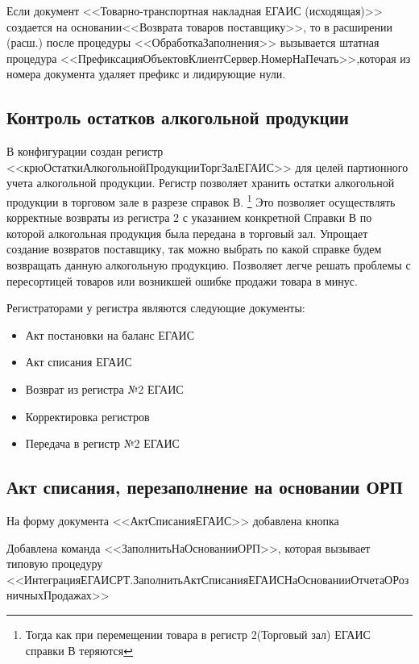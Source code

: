 Если документ <<Товарно-транспортная накладная ЕГАИС (исходящая)>> создается на основании<<Возврата товаров поставщику>>, то в расширении (расш.)
 после процедуры <<ОбработкаЗаполнения>> вызывается штатная процедура <<ПрефиксацияОбъектовКлиентСервер.НомерНаПечать>>,которая из номера документа удаляет префикс и лидирующие нули.

\subsection{Контроль остатков алкогольной продукции}\label{1009}
В конфигурации создан регистр <<крюОстаткиАлкогольнойПродукцииТоргЗалЕГАИС>> для целей партионного учета алкогольной продукции. Регистр позволяет хранить остатки алкогольной продукции в торговом зале в разрезе справок В. \footnote{Тогда как при перемещении товара в регистр 2(Торговый зал) ЕГАИС справки В теряются} Это позволяет осуществлять корректные возвраты из регистра 2 с указанием конкретной Справки В по которой алкогольная продукция была передана в торговый зал. Упрощает создание возвратов поставщику, так можно выбрать по какой справке будем возвращать данную алкогольную продукцию. Позволяет легче решать проблемы с пересортицей товаров или возникшей ошибке продажи товара в минус. \par
\vspace{\baselineskip}\par
\vspace{\baselineskip}\par
Регистраторами у регистра являются следующие документы:
\begin{itemize}
	\item Акт постановки на баланс ЕГАИС
	\item Акт списания ЕГАИС
	\item Возврат из регистра №2 ЕГАИС
	\item Корректировка регистров
	\item Передача в регистр №2 ЕГАИС
\end{itemize}

\subsection{Акт списания, перезаполнение на основании ОРП}\label{1010}
На форму документа <<АктСписанияЕГАИС>>  добавлена кнопка  \par
Добавлена команда <<ЗаполнитьНаОснованииОРП>>, которая вызывает типовую процедуру <<ИнтеграцияЕГАИСРТ.ЗаполнитьАктСписанияЕГАИСНаОснованииОтчетаОРозничныхПродажах>>


